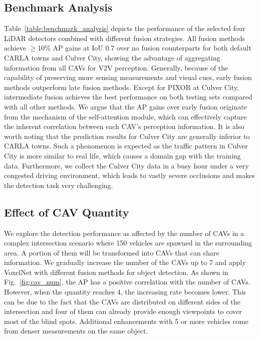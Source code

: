\documentclass[letterpaper, 10 pt, conference]{ieeeconf}  %
\begin{document}
\subsection{Benchmark Analysis}
Table~\ref{table:benchmark_analysis} depicts the performance of the selected four LiDAR detectors combined with different fusion strategies. All fusion methods achieve $\geq$10\% AP gains at IoU 0.7 over no fusion counterparts for both default CARLA towns and Culver City, showing the advantage of aggregating information from all CAVs for V2V perception. Generally, because of the capability of preserving more sensing measurements and visual cues, early fusion methods outperform late fusion methods. Except for PIXOR at Culver City, intermediate fusion achieves the best performance on both testing sets compared with all other methods. We argue that the AP gains over early fusion originate from the mechanism of the self-attention module, which can effectively capture the inherent correlation between each CAV's perception information. It is also worth noting that the prediction results for Culver City are generally inferior to CARLA towns. Such a phenomenon is expected as the traffic pattern in Culver City is more similar to real life, which causes a domain gap with the training data. Furthermore, we collect the Culver City data in a busy hour under a very congested driving environment, which leads to vastly severe occlusions and makes the detection task very challenging.

\subsection{Effect of CAV Quantity}
We explore the detection performance as affected by the number of CAVs in a complex intersection scenario where 150 vehicles are spawned in the surrounding area. A portion of them will be transformed into CAVs that can share information. We gradually increase the number of the CAVs up to 7 and apply VoxelNet with different fusion methods for object detection. As shown in Fig.~\ref{fig:cav_num}, the AP has a positive correlation with the number of CAVs. However, when the quantity reaches 4, the increasing rate becomes lower. This can be due to the fact that the CAVs are distributed on different sides of the intersection and four of them can already provide enough viewpoints to cover most of the blind spots. Additional enhancements with 5 or more vehicles come from denser measurements on the same object.
\end{document}
